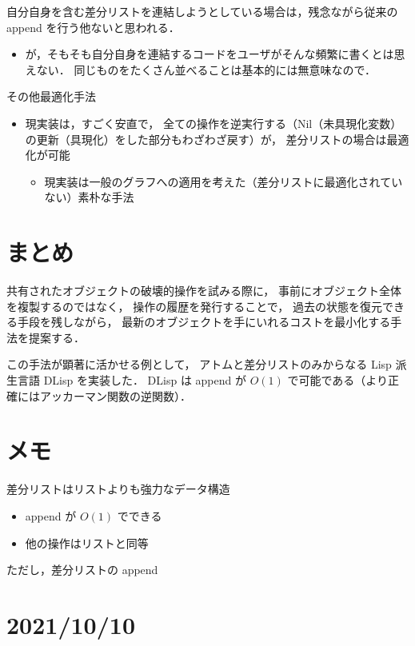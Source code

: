 \documentclass[10pt, a4j, twocolumn]{scrartcl}
\begin{document}
自分自身を含む差分リストを連結しようとしている場合は，残念ながら従来の append を行う他ないと思われる．
\begin{itemize}
\item が，そもそも自分自身を連結するコードをユーザがそんな頻繁に書くとは思えない．
同じものをたくさん並べることは基本的には無意味なので．
\end{itemize}


その他最適化手法
\begin{itemize}
\item 現実装は，すごく安直で，
全ての操作を逆実行する（Nil（未具現化変数）の更新（具現化）をした部分もわざわざ戻す）が，
差分リストの場合は最適化が可能
\begin{itemize}
\item 現実装は一般のグラフへの適用を考えた（差分リストに最適化されていない）素朴な手法
\end{itemize}
\end{itemize}


\section{まとめ}
\label{sec:org0a85c82}

共有されたオブジェクトの破壊的操作を試みる際に，
事前にオブジェクト全体を複製するのではなく，
操作の履歴を発行することで，
過去の状態を復元できる手段を残しながら，
最新のオブジェクトを手にいれるコストを最小化する手法を提案する．

この手法が顕著に活かせる例として，
アトムと差分リストのみからなる Lisp 派生言語 DLisp を実装した．
DLisp は append が \(O(1)\) で可能である（より正確にはアッカーマン関数の逆関数）．




\section{メモ}
\label{sec:orgbfa9f83}

差分リストはリストよりも強力なデータ構造
\begin{itemize}
\item append が \(O(1)\) でできる
\item 他の操作はリストと同等
\end{itemize}


ただし，差分リストの append


\section{2021/10/10}
\label{sec:orgb9d4f63}
\end{document}
